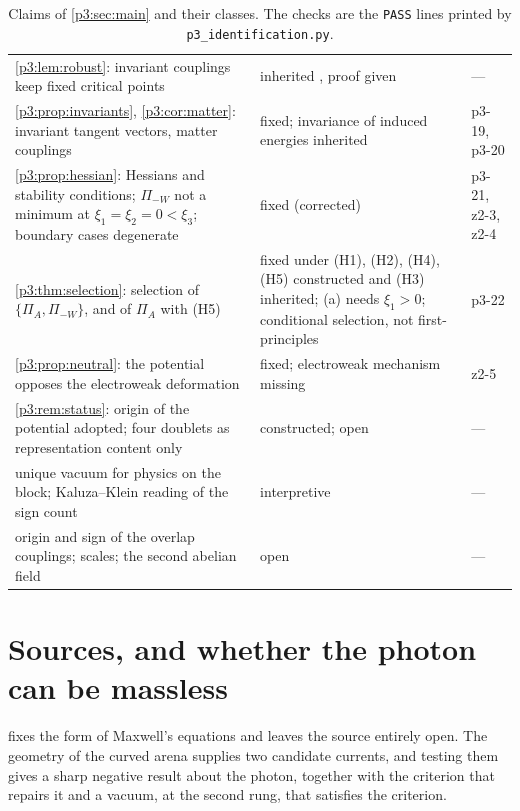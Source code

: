 \begin{table}[t]
\begin{tabular}{@{}>{\raggedright\arraybackslash}p{8.4cm}>{\raggedright\arraybackslash}p{4.3cm}>{\raggedright\arraybackslash}p{2.2cm}@{}}
\cref{p3:lem:robust}: invariant couplings keep fixed critical points & inherited \cite{Michel71,Palais79}, proof given & ---\\
\cref{p3:prop:invariants}, \cref{p3:cor:matter}: invariant tangent vectors, matter couplings & fixed; invariance of induced energies inherited & p3-19, p3-20\\
\cref{p3:prop:hessian}: Hessians and stability conditions; $\Pi_{-W}$ not a minimum at $\xi_1=\xi_2=0<\xi_3$; boundary cases degenerate & fixed (corrected) & p3-21, z2-3, z2-4\\
\cref{p3:thm:selection}: selection of $\{\Pi_A,\Pi_{-W}\}$, and of $\Pi_A$ with (H5) & fixed under (H1), (H2), (H4), (H5) constructed and (H3) inherited; (a) needs $\xi_1>0$; conditional selection, not first-principles & p3-22\\
\cref{p3:prop:neutral}: the potential opposes the electroweak deformation & fixed; electroweak mechanism missing & z2-5\\
\cref{p3:rem:status}: origin of the potential adopted; four doublets as representation content only & constructed; open & ---\\
unique vacuum for physics on the block; Kaluza--Klein reading of the sign count & interpretive & ---\\
origin and sign of the overlap couplings; scales; the second abelian field & open & ---\\
\bottomrule
\end{tabular}
\caption{Claims of \cref{p3:sec:main} and their classes. The checks are the \texttt{PASS} lines printed by \texttt{p3\_identification.py}.}
\label{p3:tab:claims}
\end{table}



\section{Sources, and whether the photon can be massless}
\label{sec:photon}

 fixes the form of Maxwell's equations and leaves the source entirely open. The geometry of the curved arena supplies two candidate
currents, and testing them gives a sharp negative result about the photon, together with the criterion that repairs it and a vacuum, at the second rung, that
satisfies the criterion.


